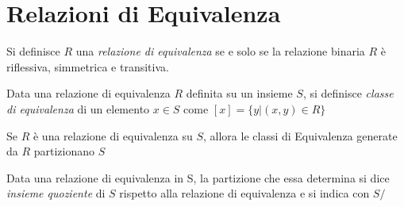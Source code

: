 \section{Relazioni di Equivalenza}
Si definisce $R$ una \emph{relazione di equivalenza} se e solo se la relazione binaria
$R$ è riflessiva, simmetrica e transitiva.


Data una relazione di equivalenza $R$ definita su un insieme $S$, si definisce
\emph{classe di equivalenza} di un elemento $x \in S$ come $[x] = \{y | (x,y) \in R \}$

\begin{thm}
Se $R$ è una relazione di equivalenza su $S$, allora le classi di Equivalenza
generate da $R$ partizionano $S$
\end{thm}

Data una relazione di equivalenza in S, la partizione che essa determina si dice
\emph{insieme quoziente} di $S$ rispetto alla relazione di equivalenza e si indica con $S/$

